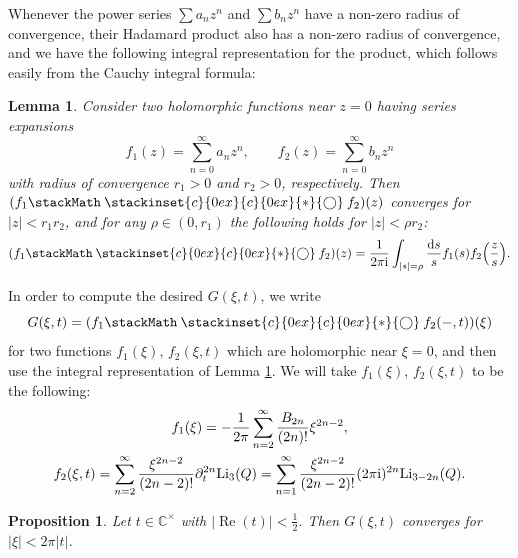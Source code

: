 \documentclass[pdftex]{sigma}
\newcommand\oast{\stackMath\mathbin{\stackinset{c}{0ex}{c}{0ex}{\ast}{\bigcirc}}}
\numberwithin{equation}{section}
\newtheorem{Lemma}[Theorem]{Lemma}
\newtheorem{Proposition}[Theorem]{Proposition}
 { \theoremstyle{definition}
\newtheorem{Definition}[Theorem]{Definition}
\newtheorem{Note}[Theorem]{Note}
\newtheorem{Example}[Theorem]{Example}
\newtheorem{Remark}[Theorem]{Remark} }
\begin{document}
Whenever the power series $\sum a_nz^n$ and $\sum b_nz^n$ have a non-zero radius of convergence, their Hadamard product also has a non-zero radius of convergence, and we have the following integral representation for the product, which follows easily from the Cauchy integral formula:

\begin{Lemma} \label{lemHad} Consider two holomorphic functions near $z=0$ having series expansions
\begin{equation*}
 f_1(z)=\sum_{n=0}^{\infty}a_nz^n, \qquad f_2(z)=\sum_{n=0}^{\infty}b_nz^n
\end{equation*}
with radius of convergence $r_1>0$ and $r_2>0$, respectively. Then $(f_1\oast f_2)(z)$ converges for $|z|<r_1r_2$, and for any $\rho \in (0,r_1)$ the following holds for $|z|<\rho r_2$:
\begin{equation}\label{Hadprodint}
 (f_1\oast f_2)(z)=\frac{1}{2\pi \mathrm{i}}\int_{|s|=\rho}\frac{{\rm d} s}{s}f_1(s)f_2\Big(\frac{z}{s}\Big).
\end{equation}
\end{Lemma}

In order to compute the desired $G(\xi,t)$, we write
\begin{equation*}
 G(\xi,t)=(f_1\oast f_2(-,t))(\xi)
\end{equation*}
for two functions $f_1(\xi)$, $f_2(\xi,t)$ which are holomorphic near $\xi=0$, and then use the integral representation of Lemma \ref{lemHad}.
We will take $f_1(\xi)$, $f_2(\xi,t)$ to be the following:
\begin{gather}
 f_1(\xi) = -\frac{1}{2\pi}\sum_{n=2}^{\infty} \frac{ B_{2n}}{ (2n)!} \xi^{2n-2},\nonumber\\
 f_2(\xi,t)= \sum_{n=2}^{\infty} \frac{\xi^{2n-2}}{(2n-2)!} \partial_t^{2n} {\rm Li}_3(Q)=\sum_{n=1}^{\infty} \frac{\xi^{2n-2}}{(2n-2)!} (2\pi \mathrm{i})^{2n} {\rm Li}_{3-2n}(Q).\label{f'sdef}
 \end{gather}

\begin{Proposition}\label{boreltransconv} Let $t\in \mathbb{C}^{\times}$ with $|\operatorname{Re}(t)|<\frac12$. Then $G(\xi,t)$ converges for $|\xi|<2\pi |t|$.
\end{Proposition}
\end{document}
